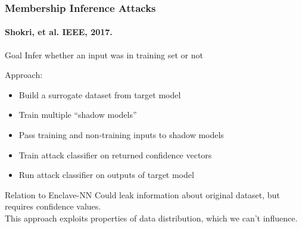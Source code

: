 \documentclass[aspectratio=169,nototalframenumber]{beamer}
\begin{document}
\begin{frame}
  \frametitle{Membership Inference Attacks}
  \framesubtitle{\small Shokri, et al. IEEE, 2017.}
  \begin{block}{Goal}
    Infer whether an input was in training set or not
  \end{block}
  \pause
  Approach:
  \begin{itemize}
  \item Build a surrogate dataset from target model
  \item Train multiple ``shadow models''
  \item Pass training and non-training inputs to shadow models
  \item Train attack classifier on returned confidence vectors
  \item Run attack classifier on outputs of target model
  \end{itemize}
  \pause
  \begin{alertblock}{Relation to Enclave-NN}
    Could leak information about original dataset, but requires confidence values.\\
    This approach exploits properties of data distribution, which we can't influence.
  \end{alertblock}
\end{frame}

\end{document}
